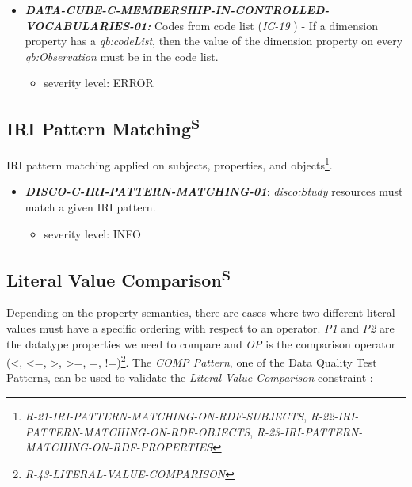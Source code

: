 \documentclass{llncs}
\begin{document}
\begin{itemize}
	\item \textbf{{\em DATA-CUBE-C-MEMBERSHIP-IN-CONTROLLED-VOCABULARIES-01:}}
	Codes from code list (\emph{IC-19} \cite{CyganiakReynolds2014}) - 
	If a dimension property has a \emph{qb:codeList}, then the value of the dimension property on every \emph{qb:Observation} must be in the code list. 
	\begin{itemize}
		\item severity level: ERROR
	\end{itemize}
\end{itemize}

\subsection{IRI Pattern Matching\textsuperscript{S}}

IRI pattern matching applied on subjects, properties, and objects\footnote{\emph{R-21-IRI-PATTERN-MATCHING-ON-RDF-SUBJECTS}, \emph{R-22-IRI-PATTERN-MATCHING-ON-RDF-OBJECTS}, \emph{R-23-IRI-PATTERN-MATCHING-ON-RDF-PROPERTIES}}.

\begin{itemize}
	\item \textbf{{\em DISCO-C-IRI-PATTERN-MATCHING-01}}: \emph{disco:Study} resources must match a given IRI pattern.
	\begin{itemize}
		\item severity level: INFO
	\end{itemize}
\end{itemize}

\subsection{Literal Value Comparison\textsuperscript{S}}

Depending on the property semantics,
there are cases where two different literal values must have
a specific ordering with respect to an operator. 
\emph{P1} and \emph{P2} are the datatype properties we need to compare and 
\emph{OP} is the comparison operator (\textless, \textless=, \textgreater, \textgreater=, =, !=)\footnote{{\em R-43-LITERAL-VALUE-COMPARISON}}.
The {\em COMP Pattern}, one of the Data Quality Test Patterns, can be used to validate the {\em Literal Value Comparison} constraint \cite{Kontokostas2014}:

\end{document}
